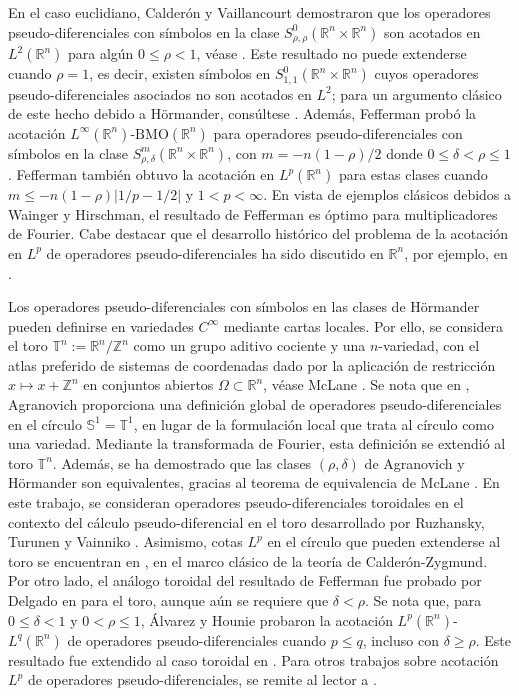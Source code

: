 En el caso euclidiano, Calderón y Vaillancourt demostraron que los operadores pseudo-diferenciales con símbolos en la clase $S^{0}_{\rho,\rho}(\mathbb{R}^n\times\mathbb{R}^n)$ son acotados en $L^2(\mathbb{R}^n)$ para algún $0\leq\rho<1$, véase \cite{calderon-vaillancourt-1, calderon-vaillancourt-2}. Este resultado no puede extenderse cuando $\rho=1$, es decir, existen símbolos en $S^{0}_{1,1}(\mathbb{R}^n\times\mathbb{R}^n)$ cuyos operadores pseudo-diferenciales asociados no son acotados en $L^2$; para un argumento clásico de este hecho debido a Hörmander, consúltese \cite{duoandikoetxea}. Además, Fefferman \cite{fefferman-Lp} probó la acotación $L^\infty(\mathbb{R}^n)$-$\mathrm{BMO}(\mathbb{R}^n)$ para operadores pseudo-diferenciales con símbolos en la clase $S^{m}_{\rho,\delta}(\mathbb{R}^n\times\mathbb{R}^n)$, con $m=-n(1-\rho)/2$ donde $0\leq \delta<\rho\leq 1$. Fefferman también obtuvo la acotación en $L^p(\mathbb{R}^n)$ para estas clases cuando $m\leq -n(1-\rho)|1/p - 1/2|$ y $1<p<\infty$. En vista de ejemplos clásicos debidos a Wainger y Hirschman, el resultado de Fefferman es óptimo para multiplicadores de Fourier. Cabe destacar que el desarrollo histórico del problema de la acotación en $L^p$ de operadores pseudo-diferenciales ha sido discutido en $\mathbb{R}^n$, por ejemplo, en \cite{nagase, wang}.  

Los operadores pseudo-diferenciales con símbolos en las clases de Hörmander pueden definirse en variedades $C^\infty$ mediante cartas locales. Por ello, se considera el toro $\mathbb{T}^n:=\mathbb{R}^n/\mathbb{Z}^n$ como un grupo aditivo cociente y una $n$-variedad, con el atlas preferido de sistemas de coordenadas dado por la aplicación de restricción $x\mapsto x + \mathbb{Z}^n$ en conjuntos abiertos $\Omega \subset \mathbb{R}^n$, véase McLane \cite{mclane}. Se nota que en \cite{agranovich}, Agranovich proporciona una definición global de operadores pseudo-diferenciales en el círculo $\mathbb{S}^1=\mathbb{T}^1$, en lugar de la formulación local que trata al círculo como una variedad. Mediante la transformada de Fourier, esta definición se extendió al toro $\mathbb{T}^n$. Además, se ha demostrado que las clases $(\rho,\delta)$ de Agranovich y Hörmander son equivalentes, gracias al teorema de equivalencia de McLane \cite{mclane}. En este trabajo, se consideran operadores pseudo-diferenciales toroidales en el contexto del cálculo pseudo-diferencial en el toro desarrollado por Ruzhansky, Turunen y Vainniko \cite{ruzhansky-turunen2, ruzhansky-turunen}. Asimismo, cotas $L^p$ en el círculo que pueden extenderse al toro se encuentran en \cite{wong}, en el marco clásico de la teoría de Calderón-Zygmund. Por otro lado, el análogo toroidal del resultado de Fefferman fue probado por Delgado en \cite{delgado} para el toro, aunque aún se requiere que $\delta<\rho$.   
Se nota que, para $0\leq \delta<1$ y $0<\rho\leq 1$, Álvarez y Hounie \cite{alvarez-hounie} probaron la acotación $L^p(\mathbb{R}^n)$-$L^q(\mathbb{R}^n)$ de operadores pseudo-diferenciales cuando $p\leq q$, incluso con $\delta \geq \rho$. Este resultado fue extendido al caso toroidal en \cite{Cardona:Martinez}. 
Para otros trabajos sobre acotación $L^p$ de operadores pseudo-diferenciales, se remite al lector a \cite{cardona, molahajloo-wong, ruzhansky-turunen-quant}.